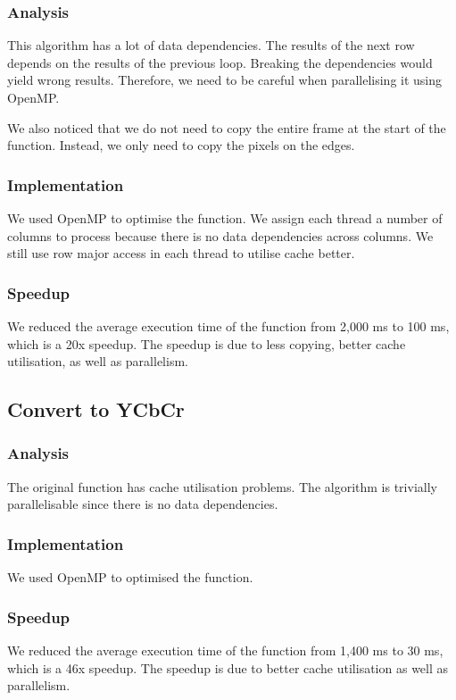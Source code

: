 \documentclass[a4paper]{article}
\begin{document}
\subsubsection{Analysis}
This algorithm has a lot of data dependencies. The results of the next
row depends on the results of the previous loop. Breaking the
dependencies would yield wrong results. Therefore, we need to be
careful when parallelising it using OpenMP.

We also noticed that we do not need to copy the entire frame at the
start of the function. Instead, we only need to copy the pixels on the
edges.

\subsubsection{Implementation}
We used OpenMP to optimise the function. We assign each thread a
number of columns to process because there is no data dependencies
across columns. We still use row major access in each thread to
utilise cache better. 

\subsubsection{Speedup}
We reduced the average execution time of the function from 2,000 ms to
100 ms, which is a 20x speedup. The speedup is due to less copying,
better cache utilisation, as well as parallelism.

\subsection{Convert to YCbCr}
\subsubsection{Analysis}
The original function has cache utilisation problems. The algorithm is
trivially parallelisable since there is no data dependencies.

\subsubsection{Implementation}
We used OpenMP to optimised the function.


\subsubsection{Speedup}
We reduced the average execution time of the function from 1,400 ms to
30 ms, which is a 46x speedup. The speedup is due to better cache
utilisation as well as parallelism.
\end{document}
